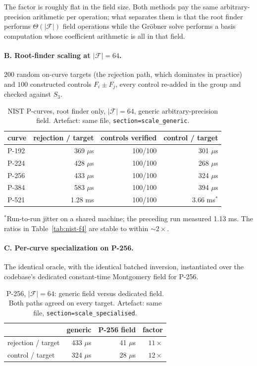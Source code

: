 \documentclass[10pt,a4paper]{article}
\theoremstyle{remark}
\newcommand{\Fb}{\mathcal{F}}
\newcommand{\Sem}[1]{S_{#1}}
\newcommand{\abs}[1]{\lvert #1 \rvert}
\newcommand{\code}[1]{\texttt{#1}}
\begin{document}
The factor is roughly flat in the field size. Both methods pay the same
arbitrary-precision arithmetic per operation; what separates them is
that the root finder performs $\Theta(\abs{\Fb})$ field operations
while the Gr\"obner solve performs a basis computation whose
coefficient arithmetic is all in that field.

\paragraph{B. Root-finder scaling at $\abs{\Fb} = 64$.} $200$ random
on-curve targets (the rejection path, which dominates in practice) and
$100$ constructed controls $F_i \pm F_j$, every control re-added in the
group and checked against $\Sem{3}$.

\begin{table}[h]
\centering
\caption{NIST P-curves, root finder only, $\abs{\Fb}=64$, generic
arbitrary-precision field. Artefact: same file,
\code{section=scale\_generic}.}
\label{tab:nist-scale}
\begin{tabular}{@{}lrrr@{}}
\toprule
curve & rejection / target & controls verified & control / target \\
\midrule
P-192 & 369 $\mu$s & 100/100 & 301 $\mu$s \\
P-224 & 428 $\mu$s & 100/100 & 268 $\mu$s \\
P-256 & 433 $\mu$s & 100/100 & 324 $\mu$s \\
P-384 & 583 $\mu$s & 100/100 & 394 $\mu$s \\
P-521 & 1.28 ms    & 100/100 & 3.66 ms$^{*}$ \\
\bottomrule
\end{tabular}

\smallskip
{\footnotesize $^{*}$Run-to-run jitter on a shared machine; the
preceding run measured 1.13 ms. The ratios in Table~\ref{tab:nist-f4}
are stable to within $\sim 2\times$.}
\end{table}

\paragraph{C. Per-curve specialization on P-256.} The identical oracle,
with the identical batched inversion, instantiated over the codebase's
dedicated constant-time Montgomery field for P-256.

\begin{table}[H]
\centering
\caption{P-256, $\abs{\Fb}=64$: generic field versus dedicated field.
Both paths agreed on every target. Artefact: same file,
\code{section=scale\_specialised}.}
\label{tab:nist-special}
\begin{tabular}{@{}lrrr@{}}
\toprule
 & generic & P-256 field & factor \\
\midrule
rejection / target & 433 $\mu$s & 41 $\mu$s & $11\times$ \\
control / target   & 324 $\mu$s & 28 $\mu$s & $12\times$ \\
\bottomrule
\end{tabular}
\end{table}
\end{document}
